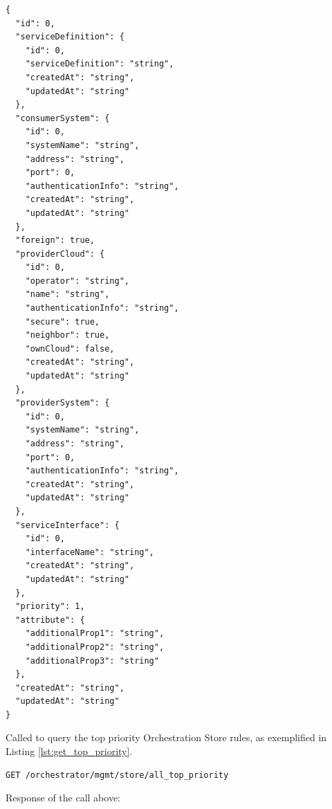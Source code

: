 \documentclass[a4paper]{arrowhead}
\newcommand{\fref}[1]{{\textcolor{ArrowheadBlue}{\hyperref[sec:functions:#1]{#1}}}}
\begin{document}
\begin{lstlisting}[language=http,label={lst:get_store_id_res},caption={A \fref{Get Store Entry by ID} response is an StoreEntry}]
{
  "id": 0,
  "serviceDefinition": {
    "id": 0,
    "serviceDefinition": "string",
    "createdAt": "string",
    "updatedAt": "string"
  },
  "consumerSystem": {
    "id": 0,
    "systemName": "string",
    "address": "string",
    "port": 0,
    "authenticationInfo": "string",
    "createdAt": "string",
    "updatedAt": "string"
  },
  "foreign": true,
  "providerCloud": {
    "id": 0,
    "operator": "string",
    "name": "string",
    "authenticationInfo": "string",
    "secure": true,
    "neighbor": true,
    "ownCloud": false,
    "createdAt": "string",
    "updatedAt": "string"
  },
  "providerSystem": {
    "id": 0,
    "systemName": "string",
    "address": "string",
    "port": 0,
    "authenticationInfo": "string",
    "createdAt": "string",
    "updatedAt": "string"
  },
  "serviceInterface": {
    "id": 0,
    "interfaceName": "string",
    "createdAt": "string",
    "updatedAt": "string"
  },
  "priority": 1,
  "attribute": {
    "additionalProp1": "string",
    "additionalProp2": "string",
    "additionalProp3": "string"
  },
  "createdAt": "string",
  "updatedAt": "string"
}
\end{lstlisting}


Called to query the top priority Orchestration Store rules, as exemplified in Listing \ref{lst:get_top_priority}.

\begin{lstlisting}[language=http,label={lst:get_top_priority},caption={A \fref{Get top Priority Entries} invocation.}]
GET /orchestrator/mgmt/store/all_top_priority

\end{lstlisting}

Response of the call above:
\end{document}
